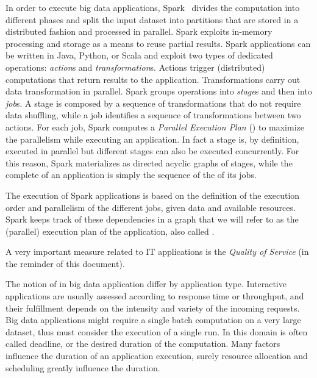 In order to execute big data applications, Spark~\cite{Zaharia2010} divides the computation into different phases and split the input dataset into partitions that are stored in a distributed fashion and processed in parallel. Spark exploits in-memory processing and storage as a means to reuse partial results. Spark applications can be written in Java, Python, or Scala and exploit two types of dedicated operations: \textit{action}s and  \textit{transformation}s. Actions trigger (distributed) computations that return results to the application. Transformations carry out data transformation in parallel. Spark groups operations into \textit{stage}s and then into \textit{job}s. A stage is composed by a sequence of transformations that do not require data shuffling, while a job identifies a sequence of transformations between two actions. For each job, Spark computes a \textit{Parallel Execution Plan} (\plan) to maximize the parallelism while executing an application. In fact a stage is, by definition, executed in parallel but different stages can also be executed concurrently. For this reason, Spark materializes \plans as directed acyclic graphs of stages, while the complete \plan of an application is simply the sequence of the \plans of its jobs. 

The execution of Spark applications is based on the definition of the execution order and parallelism of the different jobs, given data and available resources. Spark keeps track of these dependencies in a graph that we will refer to as the (parallel) execution plan of the application, also called \plan.

A very important measure related to IT applications is the \textit{Quality of Service} (\qos in the reminder of this document).

The notion of \qos in big data application differ by application type. Interactive applications are usually assessed according to response time or throughput, and their fulfillment depends on the intensity and variety of the incoming requests. Big data applications might require a single batch computation on a very large dataset, thus \qos must consider the execution of a single run. In this domain \qos is often called deadline, or the desired duration of the computation. Many factors influence the duration of an application execution, surely resource allocation and scheduling greatly influence the duration. 

